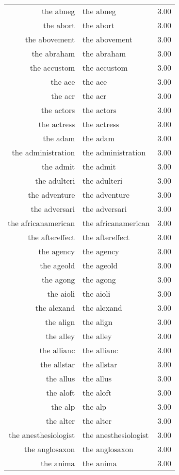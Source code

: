 \begin{table}[ht]
\begin{tabular}{rlr}
  the abneg & the abneg & 3.00 \\ 
  the abort & the abort & 3.00 \\ 
  the abovement & the abovement & 3.00 \\ 
  the abraham & the abraham & 3.00 \\ 
  the accustom & the accustom & 3.00 \\ 
  the ace & the ace & 3.00 \\ 
  the acr & the acr & 3.00 \\ 
  the actors & the actors & 3.00 \\ 
  the actress & the actress & 3.00 \\ 
  the adam & the adam & 3.00 \\ 
  the administration & the administration & 3.00 \\ 
  the admit & the admit & 3.00 \\ 
  the adulteri & the adulteri & 3.00 \\ 
  the adventure & the adventure & 3.00 \\ 
  the adversari & the adversari & 3.00 \\ 
  the africanamerican & the africanamerican & 3.00 \\ 
  the aftereffect & the aftereffect & 3.00 \\ 
  the agency & the agency & 3.00 \\ 
  the ageold & the ageold & 3.00 \\ 
  the agong & the agong & 3.00 \\ 
  the aioli & the aioli & 3.00 \\ 
  the alexand & the alexand & 3.00 \\ 
  the align & the align & 3.00 \\ 
  the alley & the alley & 3.00 \\ 
  the allianc & the allianc & 3.00 \\ 
  the allstar & the allstar & 3.00 \\ 
  the allus & the allus & 3.00 \\ 
  the aloft & the aloft & 3.00 \\ 
  the alp & the alp & 3.00 \\ 
  the alter & the alter & 3.00 \\ 
  the anesthesiologist & the anesthesiologist & 3.00 \\ 
  the anglosaxon & the anglosaxon & 3.00 \\ 
  the anima & the anima & 3.00 \\ 

\end{tabular}
\end{table}
